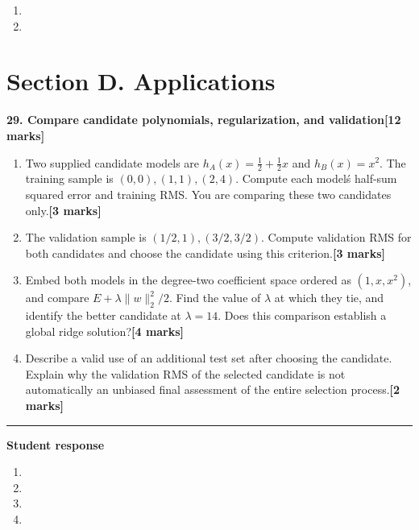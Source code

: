 \documentclass[11pt,a4paper]{article}
\newlength{\BlankAnswerHeight}\setlength{\BlankAnswerHeight}{16mm}
\newcommand{\AnswerBlank}{\leavevmode\par\vspace{\BlankAnswerHeight}}
\begin{document}
\begin{enumerate}[label=(\alph*),leftmargin=8mm,itemsep=3pt]
\item
\AnswerBlank
\item
\AnswerBlank
\end{enumerate}
\newpage\section*{Section D. Applications}
\textbf{29. Compare candidate polynomials, regularization, and validation}\hfill\textbf{[12 marks]}\par\medskip
\begin{enumerate}[label=(\alph*),leftmargin=8mm,itemsep=3pt]
\item Two supplied candidate models are \(h_A(x)=\tfrac12+\tfrac12x\) and \(h_B(x)=x^2\). The training sample is \((0,0),(1,1),(2,4)\). Compute each model\'s half-sum squared error and training RMS. You are comparing these two candidates only.\hfill\textbf{[3 marks]}
\item The validation sample is \((1/2,1),(3/2,3/2)\). Compute validation RMS for both candidates and choose the candidate using this criterion.\hfill\textbf{[3 marks]}
\item Embed both models in the degree-two coefficient space ordered as \((1,x,x^2)\), and compare \(E+\lambda\|w\|_2^2/2\). Find the value of \(\lambda\) at which they tie, and identify the better candidate at \(\lambda=14\). Does this comparison establish a global ridge solution?\hfill\textbf{[4 marks]}
\item Describe a valid use of an additional test set after choosing the candidate. Explain why the validation RMS of the selected candidate is not automatically an unbiased final assessment of the entire selection process.\hfill\textbf{[2 marks]}
\end{enumerate}\par\medskip\hrule\medskip\textbf{Student response}\par
\begin{enumerate}[label=(\alph*),leftmargin=8mm,itemsep=3pt]
\item
\AnswerBlank
\item
\AnswerBlank
\item
\AnswerBlank
\item
\AnswerBlank
\end{enumerate}
\end{document}
